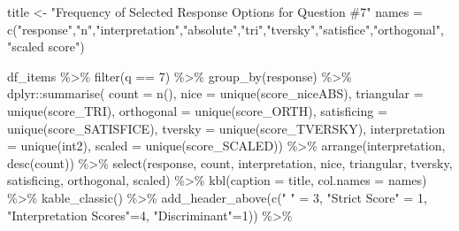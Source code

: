 \documentclass[
  letterpaper,
  DIV=11,
  numbers=noendperiod]{scrreprt}
\newenvironment{Shaded}{\begin{snugshade}}{\end{snugshade}}
\newcommand{\AttributeTok}[1]{\textcolor[rgb]{0.40,0.45,0.13}{#1}}
\newcommand{\DecValTok}[1]{\textcolor[rgb]{0.68,0.00,0.00}{#1}}
\newcommand{\FunctionTok}[1]{\textcolor[rgb]{0.28,0.35,0.67}{#1}}
\newcommand{\NormalTok}[1]{\textcolor[rgb]{0.00,0.23,0.31}{#1}}
\newcommand{\OtherTok}[1]{\textcolor[rgb]{0.00,0.23,0.31}{#1}}
\newcommand{\SpecialCharTok}[1]{\textcolor[rgb]{0.37,0.37,0.37}{#1}}
\newcommand{\StringTok}[1]{\textcolor[rgb]{0.13,0.47,0.30}{#1}}
\begin{document}
\begin{Shaded}
\begin{Highlighting}[]
\NormalTok{title }\OtherTok{\textless{}{-}} \StringTok{"Frequency of Selected Response Options for Question \#7"}
\NormalTok{names }\OtherTok{=} \FunctionTok{c}\NormalTok{(}\StringTok{"response"}\NormalTok{,}\StringTok{"n"}\NormalTok{,}\StringTok{"interpretation"}\NormalTok{,}\StringTok{"absolute"}\NormalTok{,}\StringTok{"tri"}\NormalTok{,}\StringTok{"tversky"}\NormalTok{,}\StringTok{"satisfice"}\NormalTok{,}\StringTok{"orthogonal"}\NormalTok{, }\StringTok{"scaled score"}\NormalTok{)}

\NormalTok{df\_items }\SpecialCharTok{\%\textgreater{}\%} \FunctionTok{filter}\NormalTok{(q }\SpecialCharTok{==} \DecValTok{7}\NormalTok{) }\SpecialCharTok{\%\textgreater{}\%} \FunctionTok{group\_by}\NormalTok{(response) }\SpecialCharTok{\%\textgreater{}\%}
\NormalTok{  dplyr}\SpecialCharTok{::}\FunctionTok{summarise}\NormalTok{( }\AttributeTok{count =} \FunctionTok{n}\NormalTok{(),}
                    \AttributeTok{nice =} \FunctionTok{unique}\NormalTok{(score\_niceABS),}
                    \AttributeTok{triangular =} \FunctionTok{unique}\NormalTok{(score\_TRI),}
                    \AttributeTok{orthogonal =}  \FunctionTok{unique}\NormalTok{(score\_ORTH),}
                    \AttributeTok{satisficing =}  \FunctionTok{unique}\NormalTok{(score\_SATISFICE),}
                    \AttributeTok{tversky =} \FunctionTok{unique}\NormalTok{(score\_TVERSKY),}
                    \AttributeTok{interpretation =} \FunctionTok{unique}\NormalTok{(int2),}
                    \AttributeTok{scaled =} \FunctionTok{unique}\NormalTok{(score\_SCALED)) }\SpecialCharTok{\%\textgreater{}\%}
  \FunctionTok{arrange}\NormalTok{(interpretation, }\FunctionTok{desc}\NormalTok{(count)) }\SpecialCharTok{\%\textgreater{}\%}
  \FunctionTok{select}\NormalTok{(response, count, interpretation, nice,}
\NormalTok{         triangular, tversky, satisficing, orthogonal, scaled) }\SpecialCharTok{\%\textgreater{}\%}
  \FunctionTok{kbl}\NormalTok{(}\AttributeTok{caption =}\NormalTok{ title, }\AttributeTok{col.names =}\NormalTok{ names) }\SpecialCharTok{\%\textgreater{}\%}  \FunctionTok{kable\_classic}\NormalTok{() }\SpecialCharTok{\%\textgreater{}\%}
  \FunctionTok{add\_header\_above}\NormalTok{(}\FunctionTok{c}\NormalTok{(}\StringTok{" "} \OtherTok{=} \DecValTok{3}\NormalTok{, }\StringTok{"Strict Score"} \OtherTok{=} \DecValTok{1}\NormalTok{, }\StringTok{"Interpretation Scores"}\OtherTok{=}\DecValTok{4}\NormalTok{, }\StringTok{"Discriminant"}\OtherTok{=}\DecValTok{1}\NormalTok{)) }\SpecialCharTok{\%\textgreater{}\%}

\end{Highlighting}
\end{Shaded}
\end{document}
